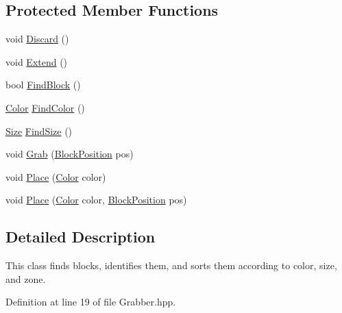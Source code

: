 \subsection*{Protected Member Functions}
\begin{DoxyCompactItemize}
\item 
void \hyperlink{classChipChipArray_1_1Grabber_a09f89b79e745db18009a022e9bfacd3a}{Discard} ()
\item 
void \hyperlink{classChipChipArray_1_1Grabber_abecb4047b4f7d5a7e691b7fb581b5a39}{Extend} ()
\item 
bool \hyperlink{classChipChipArray_1_1Grabber_ae52cf94210d8a5f468c08e59737518c4}{Find\+Block} ()
\item 
\hyperlink{definitions_8hpp_abc05a0f46084a3477cf5d5c939ff1436}{Color} \hyperlink{classChipChipArray_1_1Grabber_a8ddc7def90b874885b2745034b5677df}{Find\+Color} ()
\item 
\hyperlink{definitions_8hpp_a9809446fd16a744b6df9808293f14153}{Size} \hyperlink{classChipChipArray_1_1Grabber_a7262ce7fd6d4cc2f0210fcc9cafdd840}{Find\+Size} ()
\item 
void \hyperlink{classChipChipArray_1_1Grabber_a0a8a57e44f291581ab2862272134a592}{Grab} (\hyperlink{definitions_8hpp_ac8e1b1f4bbac5914204c97f66f97d01f}{Block\+Position} pos)
\item 
void \hyperlink{classChipChipArray_1_1Grabber_a2833eebf4e57078c0d677379babfd2d4}{Place} (\hyperlink{definitions_8hpp_abc05a0f46084a3477cf5d5c939ff1436}{Color} color)
\item 
void \hyperlink{classChipChipArray_1_1Grabber_a817de2b1ac4208fcbe983e919cede265}{Place} (\hyperlink{definitions_8hpp_abc05a0f46084a3477cf5d5c939ff1436}{Color} color, \hyperlink{definitions_8hpp_ac8e1b1f4bbac5914204c97f66f97d01f}{Block\+Position} pos)
\end{DoxyCompactItemize}


\subsection{Detailed Description}
This class finds blocks, identifies them, and sorts them according to color, size, and zone. 

Definition at line 19 of file Grabber.\+hpp.



